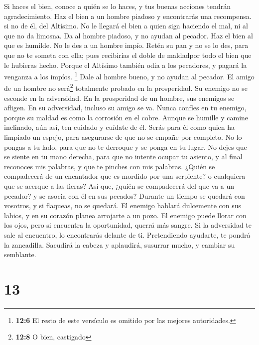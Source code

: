  Si haces el bien, conoce a quién se lo haces, y tus
buenas acciones tendrán agradecimiento.  Haz el bien a un
hombre piadoso y encontrarás una recompensa. si no de él, del Altísimo.
 No le llegará el bien a quien siga haciendo el mal, ni al
que no da limosna.  Da al hombre piadoso, y no ayudan al
pecador.  Haz el bien al que es humilde. No le des a un
hombre impío. Retén su pan y no se lo des, para que no te someta con
ella; pues recibirías el doble de maldadpor todo el bien que le hubieras
hecho.  Porque el Altísimo también odia a los pecadores, y
pagará la venganza a los impíos. \footnote{\textbf{12:6} El resto de
  este versículo es omitido por las mejores autoridades.} 
Dale al hombre bueno, y no ayudan al pecador.  El amigo de
un hombre no será\footnote{\textbf{12:8} O bien, castigado} totalmente
probado en la prosperidad. Su enemigo no se esconde en la adversidad.
 En la prosperidad de un hombre, sus enemigos se afligen.
En su adversidad, incluso su amigo se va.  Nunca confíes
en tu enemigo, porque su maldad es como la corrosión en el cobre.
 Aunque se humille y camine inclinado, aún así, ten
cuidado y cuídate de él. Serás para él como quien ha limpiado un espejo,
para asegurarse de que no se empañe por completo.  No lo
pongas a tu lado, para que no te derroque y se ponga en tu lugar. No
dejes que se siente en tu mano derecha, para que no intente ocupar tu
asiento, y al final reconoces mis palabras, y que te pinches con mis
palabras.  ¿Quién se compadecerá de un encantador que es
mordido por una serpiente? o cualquiera que se acerque a las fieras?
 Así que, ¿quién se compadecerá del que va a un pecador?
y se asocia con él en sus pecados?  Durante un tiempo se
quedará con vosotros, y si flaqueas, no se quedará.  El
enemigo hablará dulcemente con sus labios, y en su corazón planea
arrojarte a un pozo. El enemigo puede llorar con los ojos, pero si
encuentra la oportunidad, querrá más sangre.  Si la
adversidad te sale al encuentro, lo encontrarás delante de ti.
Pretendiendo ayudarte, te pondrá la zancadilla.  Sacudirá
la cabeza y aplaudirá, susurrar mucho, y cambiar su semblante.

\hypertarget{section-12}{%
\section{13}\label{section-12}}


